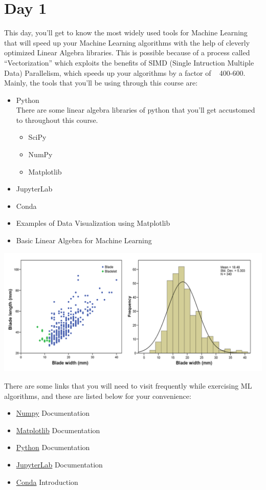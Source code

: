 \documentclass[11pt]{article}
\begin{document}
\section{Day 1}
This day, you'll get to know the most widely used tools for Machine Learning that will speed up your Machine Learning algorithms with the help of cleverly optimized Linear Algebra libraries. This is possible because of a process called ``Vectorization'' which exploits the benefits of SIMD (Single Intruction Multiple Data) Parallelism, which speeds up your algorithms by a factor of ~ 400-600. Mainly, the tools that you'll be using through this course are:
\begin{itemize}
\item Python\\
There are some linear algebra libraries of python that you'll get accustomed to throughout this course.
\begin{itemize}
\item SciPy
\item NumPy
\item Matplotlib
\end{itemize}
\item JupyterLab
\item Conda
\item Examples of Data Visualization using Matplotlib
\item Basic Linear Algebra for Machine Learning
\end{itemize}
\begin{center}
\includegraphics[scale=.7]{img/dataVis.png}
\end{center}
There are some links that you will need to visit frequently while exercising ML algorithms, and these are listed below for your convenience:
\begin{itemize}
\item \href{https://numpy.org/doc/stable/}{Numpy} Documentation
\item \href{https://matplotlib.org/contents.html}{Matplotlib} Documentation
\item \href{https://www.python.org/doc/}{Python} Documentation
\item \href{https://jupyterlab.readthedocs.io/en/stable/}{JupyterLab} Documentation
\item \href{https://www.youtube.com/watch?v=23aQdrS58e0}{Conda} Introduction
\end{itemize}
\pagebreak
\end{document}
